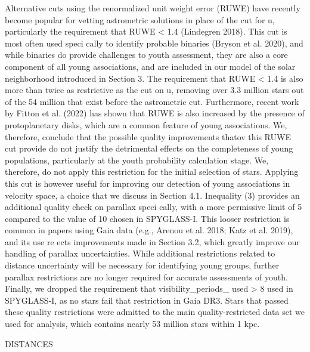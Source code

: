\documentclass[../main.tex]{subfiles}
\begin{document}
{Alternative cuts using the renormalized unit weight error
(RUWE) have recently become popular for vetting astrometric
solutions in place of the cut for u, particularly the requirement
that RUWE < 1.4 (Lindegren 2018). This cut is most often
used speci cally to identify probable binaries (Bryson et al.
2020), and while binaries do provide challenges to youth
assessment, they are also a core component of all young
associations, and are included in our model of the solar
neighborhood introduced in Section 3. The requirement that
RUWE < 1.4 is also more than twice as restrictive as the cut on
u, removing over 3.3 million stars out of the 54 million that
exist before the astrometric cut. Furthermore, recent work by
Fitton et al. (2022) has shown that RUWE is also increased by
the presence of protoplanetary disks, which are a common
feature of young associations. We, therefore, conclude that the
possible quality improvements thatov this RUWE cut provide
do not justify the detrimental effects on the completeness of
young populations, particularly at the youth probability
calculation stage. We, therefore, do not apply this restriction
for the initial selection of stars. Applying this cut is however
useful for improving our detection of young associations in
velocity space, a choice that we discuss in Section 4.1.
Inequality (3) provides an additional quality check on
parallax speci cally, with a more permissive limit of 5
compared to the value of 10 chosen in SPYGLASS-I. This
looser restriction is common in papers using Gaia data (e.g.,
Arenou et al. 2018; Katz et al. 2019), and its use re ects
improvements made in Section 3.2, which greatly improve our
handling of parallax uncertainties. While additional restrictions
related to distance uncertainty will be necessary for identifying
young groups, further parallax restrictions are no longer
required for accurate assessments of youth. Finally, we dropped
the requirement that visibility_periods_
used > 8
used in SPYGLASS-I, as no stars fail that restriction in Gaia
DR3. Stars that passed these quality restrictions were admitted
to the main quality-restricted data set we used for analysis,
which contains nearly 53 million stars within 1 kpc.

DISTANCES

}
\end{document}
